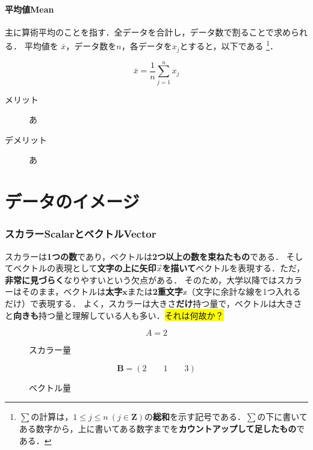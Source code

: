 \documentclass[a4paper,11pt]{ltjsarticle}
\newcommand{\idx}[1]{#1\index{#1}}
\begin{document}
\subsection{平均値Mean}
\label{sec: mean}

主に算術平均のことを指す．全データを合計し，データ数で割ることで求められる．
平均値を $\bar{x}$，データ数を$n$，各データを$x_j$とすると，以下である
\footnote{$\displaystyle{\sum}$の計算は，$1 \leq j \leq n\ (j \in \bm{Z})$の\textbf{総和}を示す記号である．$\displaystyle{\sum}$の下に書いてある数字から，上に書いてある数字までを\textbf{カウントアップして足したもの}である．}．

\begin{equation}
  \bar{x} = \frac{1}{n} \sum_{j=1}^n x_j
\end{equation}

\begin{description}
  \item[メリット] あ
  \item[デメリット] あ
\end{description}

\clearpage

\part{データのイメージ}
\label{part: deta}

\section{スカラーScalarとベクトルVector}
\label{sec: sca-vec}

\idx{スカラー}は\textbf{1つの数}であり，\idx{ベクトル}は\textbf{2つ以上の数を束ねたもの}である．
そしてベクトルの表現として\textbf{文字の上に矢印$\vec{x}$を描いて}ベクトルを表現する．ただ，\textbf{非常に見づらく}なりやすいという欠点がある．
そのため，大学以降ではスカラーはそのまま，ベクトルは\textbf{太字}$\bm{x}$または\textbf{2重文字}$\mathbb{x}$（文字に余計な線を1つ入れるだけ）で表現する．
よく，スカラーは大きさ\textbf{だけ}持つ量で，ベクトルは大きさと\textbf{向きも}持つ量と理解している人も多い．\colorbox{yellow}{それは何故か？}

\begin{figure}[htbp]
\centering
\begin{minipage}[b]{0.49\columnwidth}
  \centering
  \begin{equation*}
    A = 2
  \end{equation*}
  \caption{スカラー量}
  \label{eq: sca-quantity}
\end{minipage}
\begin{minipage}[b]{0.49\columnwidth}
  \centering
  \begin{equation*}
    \bm{B} = (2 \qquad 1 \qquad 3)
  \end{equation*}
  \caption{ベクトル量}
  \label{eq: vec-quantity}
\end{minipage}
\end{figure}
\end{document}
